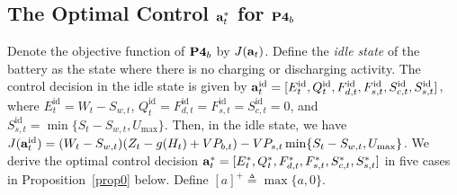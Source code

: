 \documentclass[journal]{IEEEtran}
\def\abf{{\bf a}}
\begin{document}
\subsection{The Optimal Control $\abf^*_t$  for $\text{\bf P4}_{b}$}
Denote the objective function of $\text{\bf P4}_{b}$ by $J(\abf_t)$.
Define the \emph{idle state} of the battery as the state where there is no charging or discharging activity. The control decision in the idle state is given by $\abf_t^\textrm{id}=[E_t^\textrm{id}, Q_t^\textrm{id},F_{d,t}^\textrm{id},F_{s,t}^\textrm{id},S_{c,t}^\textrm{id},S_{s,t}^\textrm{id}]$, where $E_t^\textrm{id}=W_t-S_{w,t}$, $Q_t^\textrm{id}=F_{d,t}^\textrm{id}=F_{s,t}^\textrm{id}=S_{c,t}^\textrm{id}=0$, and $S_{s,t}^\textrm{id}=\min\{S_t-S_{w,t},U_{\max}\}$. Then, in the idle state, we have
$J(\abf_t^\textrm{id})= (W_t-S_{w,t})(Z_t-g(H_t)+VP_{b,t})-VP_{s,t}\min\{S_t-S_{w,t},U_{\max}\}$.
We derive the optimal control decision $\abf_t^*=[E_t^*,Q_t^*,F_{d,t}^*,F_{s,t}^*,S_{c,t}^*,S_{s,t}^*]$   in five cases in Proposition~\ref{prop0} below.
Define $[a]^+\triangleq \max\{a,0\}$.
\end{document}
